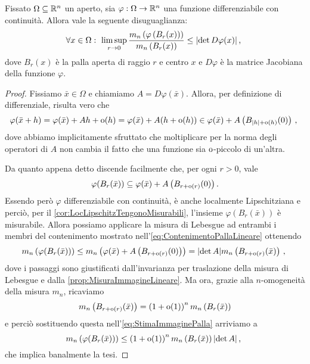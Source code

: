 \begin{lemma}\label{lemma:LimiteDeterminante}
	Fissato $\Omega\subseteq\mathbb R^n$ un aperto, sia $\varphi:\Omega\to\mathbb R^n$ una funzione differenziabile con continuità.
	Allora vale la seguente disuguaglianza:
	\begin{equation*}
		\forall x\in\Omega:\ \limsup_{r\to 0} \frac{ m_n\left(\varphi\left(B_r(x)\right)\right)} {m_n\left(B_r(x)\right)}\le \lvert\det D\varphi(x)\rvert \, \text{, } 
	\end{equation*}
	dove $B_r(x)$ è la palla aperta di raggio $r$ e centro $x$ e $D\varphi$ è la matrice Jacobiana della funzione $\varphi$.
\end{lemma}
\begin{proof}
	Fissiamo $\bar x\in\Omega$ e chiamiamo $A=D \varphi(\bar x)$.
	Allora, per definizione di differenziale, risulta vero che
	\begin{equation*}
		\varphi(\bar x+h)=\varphi(\bar x)+Ah+\mathrm{o}(h)=\varphi(\bar x)+A(h+\mathrm{o}(h))\in \varphi(\bar x)+A\left(B_{|h|+\mathrm{o}(h)}(0)\right) \, \text{, }
	\end{equation*}
	dove abbiamo implicitamente sfruttato che moltiplicare per la norma degli operatori di $A$ non cambia il fatto che una funzione sia $\mathrm{o}$-piccolo di un'altra.
	
	Da quanto appena detto discende facilmente che, per ogni $r>0$, vale
	\begin{equation}\label{eq:ContenimentoPallaLineare}
		\varphi(B_r(\bar x))\subseteq \varphi(\bar x)+A\left(B_{r+\mathrm{o}(r)}(0)\right).
	\end{equation}
	Essendo però $\varphi$ differenziabile con continuità, è anche localmente Lipschitziana e perciò, per il \cref{cor:LocLipschitzTengonoMisurabili}, l'insieme $\varphi(B_r(\bar x))$ è misurabile.
	Allora possiamo applicare la misura di Lebesgue ad entrambi i membri del contenimento mostrato nell'\cref{eq:ContenimentoPallaLineare} ottenendo
	\begin{equation}\label{eq:StimaImmaginePalla}
		m_n\left( \varphi(B_r(\bar x)) \right)\le m_n\left(\varphi(\bar x)+A\left(B_{r+\mathrm{o}(r)}(0)\right)\right)
		=\lvert \det A\rvert m_n\left(B_{r+\mathrm{o}(r)}(\bar x)\right)\, \text{, }
	\end{equation}
	dove i passaggi sono giustificati dall'invarianza per traslazione della misura di Lebesgue e dalla \cref{prop:MisuraImmagineLineare}.
	Ma ora, grazie alla $n$-omogeneità della misura $m_n$, ricaviamo
	\begin{equation*} 
		m_n\left(B_{r+\mathrm{o}(r)}(\bar x)\right)=\left(1+\mathrm{o}(1)\right)^n m_n\left( B_r(\bar x)\right)
	\end{equation*}
	e perciò sostituendo questa nell'\cref{eq:StimaImmaginePalla} arriviamo a
	\begin{equation*}
		m_n\left( \varphi(B_r(\bar x)) \right)\le \left(1+\mathrm{o}(1)\right)^n m_n\left( B_r(\bar x)\right)\lvert \det A\rvert \, \text{, }
	\end{equation*}
	che implica banalmente la tesi.
\end{proof}

